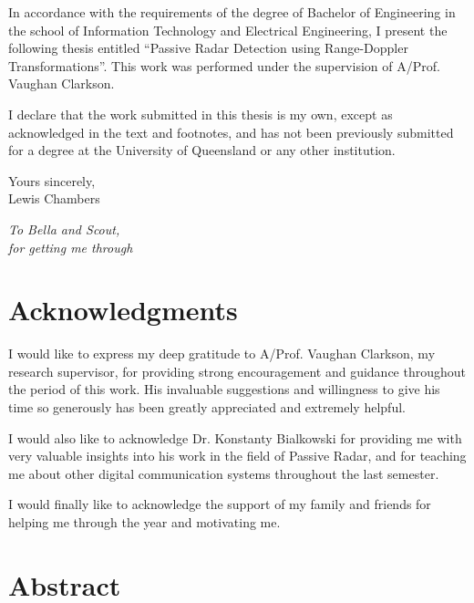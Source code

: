\documentclass[12pt,openany,a4paper]{book}
\renewcommand{\baselinestretch}{1.2}	%
\begin{document}
In accordance with the requirements of the degree of Bachelor of
Engineering in the school of Information Technology and
Electrical Engineering, I present the
following thesis entitled ``Passive Radar Detection using Range-Doppler Transformations''.  This work was performed 
under the supervision of A/Prof. Vaughan Clarkson.

I declare that the work submitted in this thesis is my own, except as
acknowledged in the text and footnotes, and has not been previously
submitted for a degree at the University of Queensland or any other
institution.

\begin{flushright}
	Yours sincerely,\\
	\bigskip\bigskip
	\medskip
	Lewis Chambers
\end{flushright}

\cleardoublepage

\vspace*{70mm}
\begin{center}
\renewcommand{\baselinestretch}{1.0}
\sl
	To Bella and Scout, \\
	for getting me through
\end{center}

\chapter{Acknowledgments}

I would like to express my deep gratitude to A/Prof. Vaughan Clarkson, my research supervisor,
for providing strong encouragement and guidance throughout the period of this work. His invaluable
suggestions and willingness to give his time so generously has been greatly appreciated and extremely helpful.

\bigskip

I would also like to acknowledge Dr. Konstanty Bialkowski for providing me with very valuable insights
into his work in the field of Passive Radar, and for teaching me about other digital communication 
systems throughout the last semester.

\bigskip

I would finally like to acknowledge the support of my family and friends for helping me through the year and motivating me.

\cleardoublepage

\chapter{Abstract}
\end{document}

